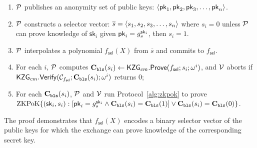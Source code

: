 
\begin{Protocol*}[t!]
\begin{mdframed}
\begin{enumerate}
\item $\mathcal{P}$ publishes an anonymity set of public keys: $\left \langle \mathsf{pk}_1,\mathsf{pk}_2,\mathsf{pk}_3,\dots,\mathsf{pk}_n \right \rangle$.
\item $\mathcal{P}$ constructs a selector vector: $\overline{s}=\left \langle s_1,s_2,s_3,\ldots,s_n \right \rangle$ where $s_i=0$ unless $\mathcal{P}$ can prove knowledge of $\mathsf{sk}_i$ given $\mathsf{pk}_i=g_s^{\mathsf{sk}_i}$, then $s_i=1$.
\item $\mathcal{P}$ interpolates a polynomial $f_\mathsf{sel}(X)$ from $\overline{s}$ and commits to $f_\mathsf{sel}$.
\item For each $i$, $\mathcal{P}$ computes $\textbf{C}_\texttt{bls}(s_i)\leftarrow\mathsf{KZG}_{cm}.\mathsf{Prove}(f_\mathsf{sel};s_i;\omega^i)$, and $\mathcal{V}$ aborts if $\mathsf{KZG}_{cm}.\mathsf{Verify}(\mathcal{C}_{f_\mathsf{sel}};\textbf{C}_\texttt{bls}(s_i);\omega^i)$ returns 0;
\item For each $\textbf{C}_\texttt{bls}(s_i)$, $\mathcal{P}$ and $\mathcal{V}$ run Protocol~\ref{alg:zkpok} to prove $\mathrm{ZKPoK} \{ (\mathsf{sk}_i,s_i) :  [\mathsf{pk}_i=g_s^{\mathsf{sk}_i} \land \textbf{C}_\texttt{bls}(s_i)=\textbf{C}_\texttt{bls}(1)  ] \lor \textbf{C}_\texttt{bls}(s_i)=\textbf{C}_\texttt{bls}(0) \}$.
\end{enumerate}
\end{mdframed}
\caption{The \bootstrap proof demonstrates that $f_\mathsf{sel}(X)$ encodes a binary selector vector of the public keys for which the exchange can prove knowledge of the corresponding secret key. \label{alg:boot}}
\end{Protocol*}

